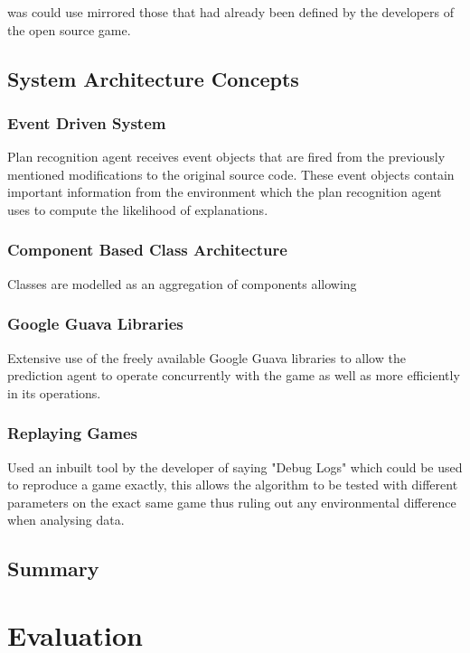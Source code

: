 \documentclass[parskip]{cs4rep}
\begin{document}
 was could use mirrored those that had already been defined by the developers of the open source game.

\section{System Architecture Concepts}

\subsection{Event Driven System}

Plan recognition agent receives event objects that are fired from the previously mentioned modifications to the original source code. These event objects contain important information from the environment which the plan recognition agent uses to compute the likelihood of explanations.

\subsection{Component Based Class Architecture}

Classes are modelled as an aggregation of components allowing

\subsection{Google Guava Libraries}

Extensive use of the freely available Google Guava libraries to allow the prediction agent to operate concurrently with the game as well as more efficiently in its operations.

\subsection{Replaying Games}

Used an inbuilt tool by the developer of saying "Debug Logs" which could be used to reproduce a game exactly, this allows the algorithm to be tested with different parameters on the exact same game thus ruling out any environmental difference when analysing data.

\section{Summary}

\chapter{Evaluation}
\end{document}

